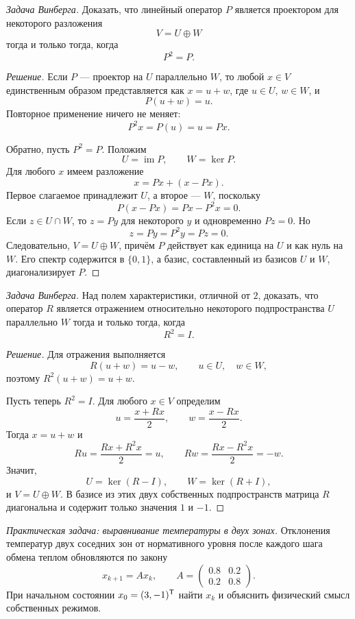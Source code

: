 \begin{problem}
\textit{Задача Винберга.}
Доказать, что линейный оператор $P$ является проектором для некоторого разложения
\[
V=U\oplus W
\]
тогда и только тогда, когда
\[
P^2=P.
\]
\end{problem}

\begin{proof}[Решение]
Если $P$ --- проектор на $U$ параллельно $W$, то любой $x\in V$ единственным образом представляется как $x=u+w$, где $u\in U$, $w\in W$, и
\[
P(u+w)=u.
\]
Повторное применение ничего не меняет:
\[
P^2x=P(u)=u=Px.
\]

Обратно, пусть $P^2=P$. Положим
\[
U=\operatorname{im}P,
\qquad
W=\ker P.
\]
Для любого $x$ имеем разложение
\[
x=Px+(x-Px).
\]
Первое слагаемое принадлежит $U$, а второе --- $W$, поскольку
\[
P(x-Px)=Px-P^2x=0.
\]
Если $z\in U\cap W$, то $z=Py$ для некоторого $y$ и одновременно $Pz=0$. Но
\[
z=Py=P^2y=Pz=0.
\]
Следовательно, $V=U\oplus W$, причём $P$ действует как единица на $U$ и как нуль на $W$. Его спектр содержится в $\{0,1\}$, а базис, составленный из базисов $U$ и $W$, диагонализирует $P$.
\end{proof}

\begin{problem}
\textit{Задача Винберга.}
Над полем характеристики, отличной от $2$, доказать, что оператор $R$ является отражением относительно некоторого подпространства $U$ параллельно $W$ тогда и только тогда, когда
\[
R^2=I.
\]
\end{problem}

\begin{proof}[Решение]
Для отражения выполняется
\[
R(u+w)=u-w,
\qquad u\in U,
\quad w\in W,
\]
поэтому $R^2(u+w)=u+w$.

Пусть теперь $R^2=I$. Для любого $x\in V$ определим
\[
u=\frac{x+Rx}{2},
\qquad
w=\frac{x-Rx}{2}.
\]
Тогда $x=u+w$ и
\[
Ru=\frac{Rx+R^2x}{2}=u,
\qquad
Rw=\frac{Rx-R^2x}{2}=-w.
\]
Значит,
\[
U=\ker(R-I),
\qquad
W=\ker(R+I),
\]
и $V=U\oplus W$. В базисе из этих двух собственных подпространств матрица $R$ диагональна и содержит только значения $1$ и $-1$.
\end{proof}

\begin{problem}
\textit{Практическая задача: выравнивание температуры в двух зонах.}
Отклонения температур двух соседних зон от нормативного уровня после каждого шага обмена теплом обновляются по закону
\[
x_{k+1}=Ax_k,
\qquad
A=
\begin{pmatrix}
0.8&0.2\\
0.2&0.8
\end{pmatrix}.
\]
При начальном состоянии $x_0=(3,-1)^{\mathsf{T}}$ найти $x_k$ и объяснить физический смысл собственных режимов.
\end{problem}

